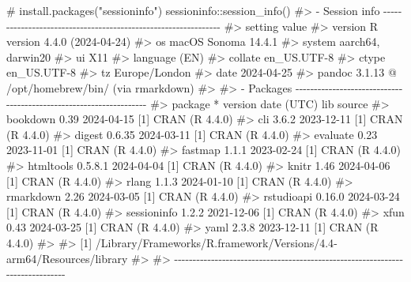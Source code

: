 \documentclass[
  10pt,
  a4paper,
]{book}
\newenvironment{Shaded}{\begin{snugshade}}{\end{snugshade}}
\newcommand{\CommentTok}[1]{\textcolor[rgb]{0.37,0.37,0.37}{#1}}
\newcommand{\FunctionTok}[1]{\textcolor[rgb]{0.28,0.35,0.67}{#1}}
\newcommand{\NormalTok}[1]{\textcolor[rgb]{0.00,0.46,0.62}{#1}}
\newcommand{\SpecialCharTok}[1]{\textcolor[rgb]{0.37,0.37,0.37}{#1}}
\begin{document}
\begin{Shaded}
\begin{Highlighting}[]
\CommentTok{\# install.packages("sessioninfo")}
\NormalTok{sessioninfo}\SpecialCharTok{::}\FunctionTok{session\_info}\NormalTok{()}
\CommentTok{\#\textgreater{} {-} Session info {-}{-}{-}{-}{-}{-}{-}{-}{-}{-}{-}{-}{-}{-}{-}{-}{-}{-}{-}{-}{-}{-}{-}{-}{-}{-}{-}{-}{-}{-}{-}{-}{-}{-}{-}{-}{-}{-}{-}{-}{-}{-}{-}{-}{-}{-}{-}{-}{-}{-}{-}{-}{-}{-}{-}{-}{-}{-}{-}{-}{-}{-}{-}}
\CommentTok{\#\textgreater{}  setting  value}
\CommentTok{\#\textgreater{}  version  R version 4.4.0 (2024{-}04{-}24)}
\CommentTok{\#\textgreater{}  os       macOS Sonoma 14.4.1}
\CommentTok{\#\textgreater{}  system   aarch64, darwin20}
\CommentTok{\#\textgreater{}  ui       X11}
\CommentTok{\#\textgreater{}  language (EN)}
\CommentTok{\#\textgreater{}  collate  en\_US.UTF{-}8}
\CommentTok{\#\textgreater{}  ctype    en\_US.UTF{-}8}
\CommentTok{\#\textgreater{}  tz       Europe/London}
\CommentTok{\#\textgreater{}  date     2024{-}04{-}25}
\CommentTok{\#\textgreater{}  pandoc   3.1.13 @ /opt/homebrew/bin/ (via rmarkdown)}
\CommentTok{\#\textgreater{} }
\CommentTok{\#\textgreater{} {-} Packages {-}{-}{-}{-}{-}{-}{-}{-}{-}{-}{-}{-}{-}{-}{-}{-}{-}{-}{-}{-}{-}{-}{-}{-}{-}{-}{-}{-}{-}{-}{-}{-}{-}{-}{-}{-}{-}{-}{-}{-}{-}{-}{-}{-}{-}{-}{-}{-}{-}{-}{-}{-}{-}{-}{-}{-}{-}{-}{-}{-}{-}{-}{-}{-}{-}{-}{-}}
\CommentTok{\#\textgreater{}  package     * version date (UTC) lib source}
\CommentTok{\#\textgreater{}  bookdown      0.39    2024{-}04{-}15 [1] CRAN (R 4.4.0)}
\CommentTok{\#\textgreater{}  cli           3.6.2   2023{-}12{-}11 [1] CRAN (R 4.4.0)}
\CommentTok{\#\textgreater{}  digest        0.6.35  2024{-}03{-}11 [1] CRAN (R 4.4.0)}
\CommentTok{\#\textgreater{}  evaluate      0.23    2023{-}11{-}01 [1] CRAN (R 4.4.0)}
\CommentTok{\#\textgreater{}  fastmap       1.1.1   2023{-}02{-}24 [1] CRAN (R 4.4.0)}
\CommentTok{\#\textgreater{}  htmltools     0.5.8.1 2024{-}04{-}04 [1] CRAN (R 4.4.0)}
\CommentTok{\#\textgreater{}  knitr         1.46    2024{-}04{-}06 [1] CRAN (R 4.4.0)}
\CommentTok{\#\textgreater{}  rlang         1.1.3   2024{-}01{-}10 [1] CRAN (R 4.4.0)}
\CommentTok{\#\textgreater{}  rmarkdown     2.26    2024{-}03{-}05 [1] CRAN (R 4.4.0)}
\CommentTok{\#\textgreater{}  rstudioapi    0.16.0  2024{-}03{-}24 [1] CRAN (R 4.4.0)}
\CommentTok{\#\textgreater{}  sessioninfo   1.2.2   2021{-}12{-}06 [1] CRAN (R 4.4.0)}
\CommentTok{\#\textgreater{}  xfun          0.43    2024{-}03{-}25 [1] CRAN (R 4.4.0)}
\CommentTok{\#\textgreater{}  yaml          2.3.8   2023{-}12{-}11 [1] CRAN (R 4.4.0)}
\CommentTok{\#\textgreater{} }
\CommentTok{\#\textgreater{}  [1] /Library/Frameworks/R.framework/Versions/4.4{-}arm64/Resources/library}
\CommentTok{\#\textgreater{} }
\CommentTok{\#\textgreater{} {-}{-}{-}{-}{-}{-}{-}{-}{-}{-}{-}{-}{-}{-}{-}{-}{-}{-}{-}{-}{-}{-}{-}{-}{-}{-}{-}{-}{-}{-}{-}{-}{-}{-}{-}{-}{-}{-}{-}{-}{-}{-}{-}{-}{-}{-}{-}{-}{-}{-}{-}{-}{-}{-}{-}{-}{-}{-}{-}{-}{-}{-}{-}{-}{-}{-}{-}{-}{-}{-}{-}{-}{-}{-}{-}{-}{-}{-}}
\end{Highlighting}
\end{Shaded}
\end{document}
